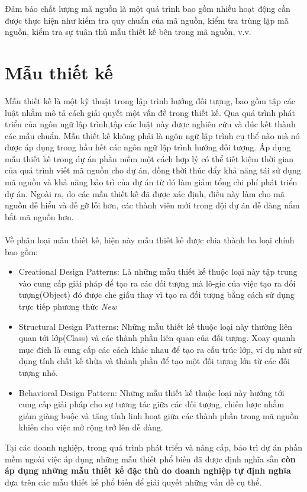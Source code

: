 \documentclass[12pt]{report}
\begin{document}
\noindent Đảm bảo chất lượng mã nguồn là một quá trình bao gồm nhiều hoạt động cần được thực hiện như kiểm tra quy chuẩn của mã nguồn, kiểm tra trùng lặp mã nguồn, kiểm tra sự tuân thủ mẫu thiết kế bên trong mã nguồn, v.v.
\section{Mẫu thiết kế}
Mẫu thiết kế là một kỹ thuật trong lập trình hướng đối tượng, bao gồm tập các luật nhằm mô tả cách giải quyết một vấn đề trong thiết kế. Qua quá trình phát triển của ngôn ngữ lập trình,tập các luật này được nghiên cứu và đúc kết thành các mẫu chuẩn. Mẫu thiết kế không phải là ngôn ngữ lập trình cụ thể nào mà nó được áp dụng trong hầu hết các ngôn ngữ lập trình hướng đối tượng.
Áp dụng mẫu thiết kế trong dự án phần mềm một cách hợp lý có thể tiết kiệm thời gian của quá trình viết mã nguồn cho dự án, đồng thời thúc đẩy khả năng tái sử dụng mã nguồn và khả năng bảo trì của dự án từ đó làm giảm tổng chi phí phát triển dự án. Ngoài ra, do các mẫu thiết kế đã được xác định, điều này làm cho mã nguồn dễ hiểu và dễ gỡ lỗi hơn, các thành viên mới trong đội dự án dễ dàng nắm bắt mã nguồn hơn.
\\\\
Về phân loại mẫu thiết kế, hiện này mẫu thiết kế được chia thành ba loại chính bao gồm:
\begin{itemize}
	\item Creational Design Patterns: Là những mẫu thiết kế thuộc loại này tập trung vào cung cấp giải pháp để tạo ra các đối tượng mà lô-gic của việc tạo ra đối tượng(Object) đó được che giấu thay vì tạo ra đối tượng bằng cách sử dụng trực tiếp phương thức \textit{New}
	\item Structural Design Patterns: Những mẫu thiết kế thuộc loại này thường liên quan tới lớp(Class) và các thành phần liên quan của đối tượng. Xoay quanh mục đích là cung cấp các cách khác nhau để tạo ra cấu trúc lớp, ví dụ như sử dụng tính chất kế thừa và thành phần để tạo một đối tượng lớn từ các đối tượng nhỏ.
	\item Behavioral Design Pattern: Những mẫu thiết kế thuộc loại này hướng tới cung cấp giải pháp cho sự tương tác giữa các đối tượng, chiến lược nhằm giảm giàng buộc và tăng tính linh hoạt giữa các thành phần trong mã nguồn khiến cho việc mở rộng trở lên dễ dàng.
\end{itemize}
Tại các doanh nghiệp, trong quá trình phát triển và nâng cấp, bảo trì dự án phần mềm ngoài việc áp dụng những mẫu thiết phổ biến đã được định nghĩa sẵn \textbf{còn áp dụng những mẫu thiết kế đặc thù do doanh nghiệp tự định nghĩa } dựa trên các mẫu thiết kế phổ biến để giải quyết những vấn đề cụ thể.
\end{document}

